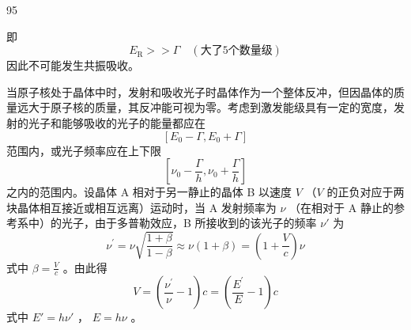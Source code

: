 \begin{solution}{95}
\begin{subsolution}
即
\begin{equation}
E _ {\mathrm{R}} > > \Gamma \quad (\text {大了} 5 \text {个数量级})
\label{eq:20.s95}
\end{equation}
因此不可能发生共振吸收。
\end{subsolution}
\begin{subsolution}
当原子核处于晶体中时，发射和吸收光子时晶体作为一个整体反冲，但因晶体的质量远大于原子核的质量，其反冲能可视为零。考虑到激发能级具有一定的宽度，发射的光子和能够吸收的光子的能量都应在
\begin{equation}
\left[ E _ {0} - \Gamma , E _ {0} + \Gamma \right]
\label{eq:21.s95}
\end{equation}
范围内，或光子频率应在上下限
\begin{equation}
\left[ \nu_ {0} - \frac {\Gamma}{h}, \nu_ {0} + \frac {\Gamma}{h} \right]
\label{eq:22.s95}
\end{equation}
之内的范围内。设晶体 A 相对于另一静止的晶体 B 以速度 $V$ （$V$ 的正负对应于两块晶体相互接近或相互远离）运动时，当 A 发射频率为 $\nu$ （在相对于 A 静止的参考系中）的光子，由于多普勒效应，B 所接收到的该光子的频率 $\nu'$ 为
\begin{equation}
\nu^ {\prime} = \nu \sqrt {\frac {1 + \beta}{1 - \beta}} \approx \nu (1 + \beta) = \left(1 + \frac {V}{c}\right) \nu
\label{eq:23.s95}
\end{equation}
式中 $\beta = \frac{V}{c}$ 。由此得
\begin{equation}
V = \left(\frac {\nu ^ {\prime}}{\nu} - 1\right) c = \left(\frac {E ^ {\prime}}{E} - 1\right) c
\label{eq:24.s95}
\end{equation}
式中 $E' = h\nu'$ ， $E = h\nu$ 。


\end{subsolution}
\end{solution}
